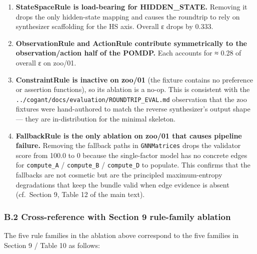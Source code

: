 \documentclass[
]{article}
\begin{document}
\begin{enumerate}
\def\labelenumi{\arabic{enumi}.}
\item
  \textbf{StateSpaceRule is load-bearing for HIDDEN\_STATE.} Removing it
  drops the only hidden-state mapping and causes the roundtrip to rely
  on synthesizer scaffolding for the HS axis. Overall ε drops by 0.333.
\item
  \textbf{ObservationRule and ActionRule contribute symmetrically to the
  observation/action half of the POMDP.} Each accounts for ≈ 0.28 of
  overall ε on zoo/01.
\item
  \textbf{ConstraintRule is inactive on zoo/01} (the fixture contains no
  preference or assertion functions), so its ablation is a no-op. This
  is consistent with the
  \texttt{../cogant/docs/evaluation/ROUNDTRIP\_EVAL.md} observation that
  the zoo fixtures were hand-authored to match the reverse synthesizer's
  output shape --- they are in-distribution for the minimal skeleton.
\item
  \textbf{FallbackRule is the only ablation on zoo/01 that causes
  pipeline failure.} Removing the fallback paths in \texttt{GNNMatrices}
  drops the validator score from 100.0 to 0 because the single-factor
  model has no concrete edges for \texttt{compute\_A} /
  \texttt{compute\_B} / \texttt{compute\_D} to populate. This confirms
  that the fallbacks are not cosmetic but are the principled
  maximum-entropy degradations that keep the bundle valid when edge
  evidence is absent (cf.~Section 9, Table 12 of the main text).
\end{enumerate}

\subsubsection{B.2 Cross-reference with Section 9 rule-family
ablation}\label{b.2-cross-reference-with-section-9-rule-family-ablation}

The five rule families in the ablation above correspond to the five
families in Section 9 / Table 10 as follows:
\end{document}
